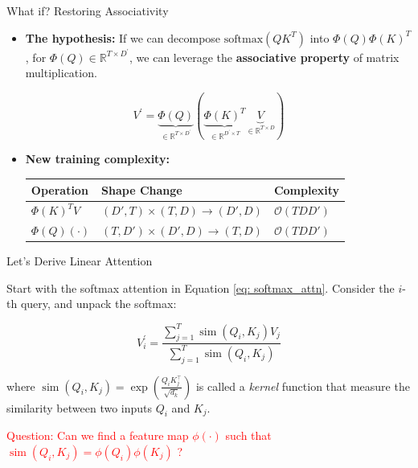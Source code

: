 \documentclass[aspectratio=169]{beamer}
\theoremstyle{definition}
\begin{document}
\begin{frame}{What if? Restoring Associativity}

\begin{itemize}
    \item \textbf{The hypothesis:} If we can decompose $\text{softmax}(QK^T)$ into $\Phi(Q)\Phi(K)^T$, for $\Phi(Q) \in \mathbb{R}^{T \times D^\prime}$, we can leverage the \textbf{associative property} of matrix multiplication.
\end{itemize}

\begin{equation}
V^{\prime} = \underbrace{\Phi(Q)}_{\in \mathbb{R}^{T \times D^{\prime}}} \left( \underbrace{\Phi(K)^T}_{\in \mathbb{R}^{D^{\prime} \times T}} \underbrace{V}_{\in \mathbb{R}^{T \times D}} \right)
\end{equation}

\begin{itemize}
    \item \textbf{New training complexity:}
    \begin{center}
    \renewcommand{\arraystretch}{1.5}
    \begin{tabular}{lll}
    \toprule
    \textbf{Operation} & \textbf{Shape Change} & \textbf{Complexity} \\ \midrule
    $\Phi(K)^T V$      & $(D', T) \times (T, D) \to (D', D)$ & $\mathcal{O}(T D D')$ \\
    $\Phi(Q) (\cdot)$  & $(T, D') \times (D', D) \to (T, D)$ & $\mathcal{O}(T D D')$ \\ \bottomrule
    \end{tabular}
    \end{center}
\end{itemize}

\end{frame}




\begin{frame}{Let's Derive Linear Attention}



Start with the softmax attention in Equation \ref{eq: softmax_attn}. Consider the $i$-th query, and unpack the softmax:

\begin{equation}
    V_i^{\prime} = \frac{\sum_{j=1}^T \operatorname{sim}(Q_i, K_j) V_j}{\sum_{j=1}^T \operatorname{sim}(Q_i, K_j)}
\end{equation}

where $\operatorname{sim}(Q_i, K_j) = \exp \left( \frac{Q_i K_j^\top}{\sqrt{d_k}} \right)$ is called a \textit{kernel} function that measure the similarity between two inputs $Q_i$ and $K_j$.

\vspace{2em}

\textcolor{red}{Question: Can we find a feature map $\phi(\cdot)$ such that $\operatorname{sim}(Q_i, K_j) = \phi(Q_i) \phi(K_j)$ ?}


\end{frame}
\end{document}
